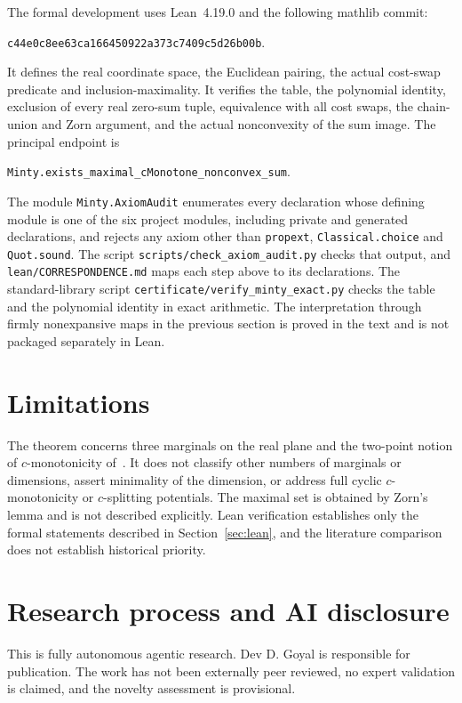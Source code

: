 \documentclass[11pt]{article}
\begin{document}
The formal development uses Lean~4.19.0 and the following mathlib commit:
\begin{center}\small
\nolinkurl{c44e0c8ee63ca166450922a373c7409c5d26b00b}.
\end{center}
It defines the real coordinate space, the Euclidean pairing, the actual
cost-swap predicate and inclusion-maximality. It verifies the table,
the polynomial identity, exclusion of every real zero-sum tuple,
equivalence with all cost swaps, the chain-union and Zorn argument, and
the actual nonconvexity of the sum image. The principal endpoint is
\begin{center}\small
\nolinkurl{Minty.exists_maximal_cMonotone_nonconvex_sum}.
\end{center}
The module \texttt{Minty.AxiomAudit} enumerates every declaration whose
defining module is one of the six project modules, including private and
generated declarations, and rejects any axiom other than
\texttt{propext}, \texttt{Classical.choice} and \texttt{Quot.sound}. The
script \texttt{scripts/check\_axiom\_audit.py} checks that output, and
\texttt{lean/CORRESPONDENCE.md} maps each step above to its declarations.
The standard-library script \texttt{certificate/verify\_minty\_exact.py}
checks the table and the polynomial identity in exact arithmetic. The
interpretation through firmly nonexpansive maps in the previous section
is proved in the text and is not packaged separately in Lean.

\section{Limitations}\label{sec:limits}

The theorem concerns three marginals on the real plane and the two-point
notion of $c$-monotonicity of~\cite{BBPW}. It does not classify other
numbers of marginals or dimensions, assert minimality of the dimension,
or address full cyclic $c$-monotonicity or $c$-splitting potentials. The
maximal set is obtained by Zorn's lemma and is not described explicitly.
Lean verification establishes only the formal statements described in
Section~\ref{sec:lean}, and the literature comparison does not establish
historical priority.

\section{Research process and AI disclosure}\label{sec:disclosure}

This is fully autonomous agentic research. Dev D. Goyal is responsible
for publication. The work has not been externally peer reviewed, no
expert validation is claimed, and the novelty assessment is provisional.
\end{document}
